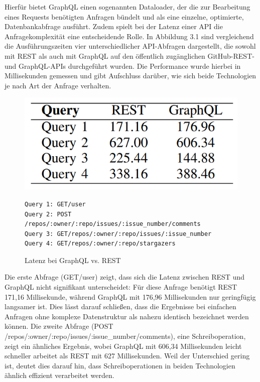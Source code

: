 \noindent
Hierfür bietet GraphQL einen sogenannten Dataloader, der die zur Bearbeitung eines Requests benötigten Anfragen bündelt und als eine einzelne, optimierte, Datenbankabfrage ausführt. \citep{nordstrom2022graphql}
\newpage
\noindent
Zudem spielt bei der Latenz einer API die Anfragekomplexität eine entscheidende Rolle. In Abbildung 3.1 sind vergleichend die Ausführungszeiten vier unterschiedlicher API-Abfragen dargestellt, die sowohl mit REST als auch mit GraphQL auf den öffentlich zugänglichen GitHub-REST- und GraphQL-APIs durchgeführt wurden. Die Performance wurde hierbei in Millisekunden gemessen und gibt Aufschluss darüber, wie sich beide Technologien je nach Art der Anfrage verhalten.
\begin{figure}[H]
	\centering
	\includegraphics[scale=.5]{Illustrations/cangraphqlreplacerest.png}
\begin{BVerbatim}
Query 1: GET/user
Query 2: POST /repos/:owner/:repo/issues/:issue_number/comments
Query 3: GET/repos/:owner/:repo/issues/:issue_number
Query 4: GET/repos/:owner/:repo/stargazers
\end{BVerbatim}
	\caption{Latenz bei GraphQL vs. REST \citep{graphqlreplacerest}}
\end{figure}
\noindent
Die erste Abfrage (GET/user) zeigt, dass sich die Latenz zwischen REST und GraphQL nicht signifikant unterscheidet: Für diese Anfrage benötigt REST 171,16 Millisekunde, während GraphQL mit 176,96 Millisekunden nur geringfügig langsamer ist. Dies lässt darauf schließen, dass die Ergebnisse bei einfachen Anfragen ohne komplexe Datenstruktur als nahezu identisch bezeichnet werden können. Die zweite Abfrage (POST /repos/:owner/:repo/issues/:issue\_number/comments), eine Schreiboperation, zeigt ein ähnliches Ergebnis, wobei GraphQL mit 606,34 Millisekunden leicht schneller arbeitet als REST mit 627 Millisekunden. Weil der Unterschied gering ist, deutet dies darauf hin, dass Schreiboperationen in beiden Technologien ähnlich effizient verarbeitet werden. 
